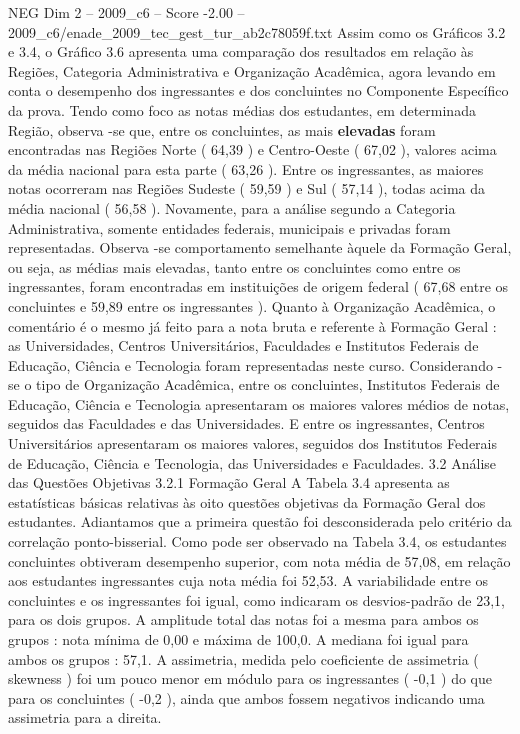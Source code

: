 \begin{textsample}{NEG Dim 2 – 2009\_c6 – Score -2.00 – 2009\_c6/enade\_2009\_tec\_gest\_tur\_ab2c78059f.txt}
Assim como os Gráficos 3.2 e 3.4, o Gráfico 3.6 apresenta uma comparação dos resultados em relação às Regiões, Categoria Administrativa e Organização Acadêmica, agora levando em conta o desempenho dos ingressantes e dos concluintes no Componente Específico da prova.
Tendo como foco as notas médias dos estudantes, em determinada Região, observa -se que, entre os concluintes, as mais \textbf{elevadas} foram encontradas nas Regiões Norte ( 64,39 ) e Centro-Oeste ( 67,02 ), valores acima da média nacional para esta parte ( 63,26 ).
Entre os ingressantes, as maiores notas ocorreram nas Regiões Sudeste ( 59,59 ) e Sul ( 57,14 ), todas acima da média nacional ( 56,58 ).
Novamente, para a análise segundo a Categoria Administrativa, somente entidades federais, municipais e privadas foram representadas.
Observa -se comportamento semelhante àquele da Formação Geral, ou seja, as médias mais elevadas, tanto entre os concluintes como entre os ingressantes, foram encontradas em instituições de origem federal ( 67,68 entre os concluintes e 59,89 entre os ingressantes ).
Quanto à Organização Acadêmica, o comentário é o mesmo já feito para a nota bruta e referente à Formação Geral : as Universidades, Centros Universitários, Faculdades e Institutos Federais de Educação, Ciência e Tecnologia foram representadas neste curso.
Considerando -se o tipo de Organização Acadêmica, entre os concluintes, Institutos Federais de Educação, Ciência e Tecnologia apresentaram os maiores valores médios de notas, seguidos das Faculdades e das Universidades.
E entre os ingressantes, Centros Universitários apresentaram os maiores valores, seguidos dos Institutos Federais de Educação, Ciência e Tecnologia, das Universidades e Faculdades. 3.2 Análise das Questões Objetivas 3.2.1 Formação Geral A Tabela 3.4 apresenta as estatísticas básicas relativas às oito questões objetivas da Formação Geral dos estudantes.
Adiantamos que a primeira questão foi desconsiderada pelo critério da correlação ponto-bisserial.
Como pode ser observado na Tabela 3.4, os estudantes concluintes obtiveram desempenho superior, com nota média de 57,08, em relação aos estudantes ingressantes cuja nota média foi 52,53.
A variabilidade entre os concluintes e os ingressantes foi igual, como indicaram os desvios-padrão de 23,1, para os dois grupos.
A amplitude total das notas foi a mesma para ambos os grupos : nota mínima de 0,00 e máxima de 100,0.
A mediana foi igual para ambos os grupos : 57,1.
A assimetria, medida pelo coeficiente de assimetria ( skewness ) foi um pouco menor em módulo para os ingressantes ( -0,1 ) do que para os concluintes ( -0,2 ), ainda que ambos fossem negativos indicando uma assimetria para a direita.

\end{textsample}
